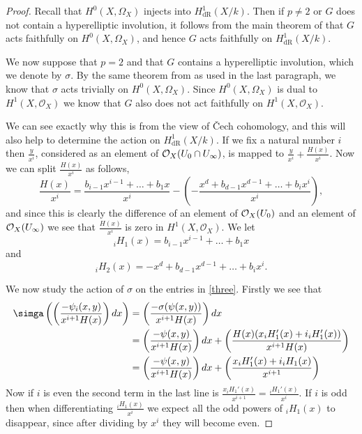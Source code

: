 \documentclass[draft, 11pt]{article} %
\theoremstyle{plain}
\theoremstyle{remark}
\newcommand{\cO}{{\cal O}}
\newcommand{\cech}{\v{C}ech }
\newcommand{\hzero}{{H^0(X,\Omega_X)}}
\newcommand{\hone}{H^1(X,\mathcal{O}_X)}
\newcommand{\derhamhone}{H_{\text {dR}}^1(X/k)}
\begin{document}
\begin{proof}
Recall that $H^0(X,\Omega_X)$ injects into $\derhamhone$.
Then if $p \neq 2$ or $G$ does not contain a hyperelliptic involution, it follows from the main theorem of \cite{faithfulaction} that $G$ acts faithfully on $H^0(X,\Omega_X)$, and hence $G$ acts faithfully on $\derhamhone$.

We now suppose that $p=2$ and that $G$ contains a hyperelliptic involution, which we denote by $\sigma$.
By the same theorem from \cite{faithfulaction} as used in the last paragraph, we know that $\sigma$ acts trivially on $\hzero$.
Since $\hzero$ is dual to $\hone$ we know that $G$ also does not act faithfully on $\hone$.

We can see exactly why this is from the view of \cech cohomology, and this will also help to determine the action on $\derhamhone$.
If we fix a natural number $i$ then $\frac{y}{x^i}$, considered as an element of $\cO_X(U_0\cap U_\infty)$, is mapped to $\frac{y}{x^i} + \frac{H(x)}{x^i}$. 
Now we can split $\frac{H(x)}{x^i}$ as follows, 
\begin{equation*}
\frac{H(x)}{x^i} =  \frac{b_{i-1}x^{i-1} + \ldots + b_1x}{x^i} - \left( - \frac{x^d + b_{d-1}x^{d-1} + \ldots + b_ix^i}{x^i} \right),
\end{equation*}
and since this is clearly the difference of an element of $\cO_X(U_0)$ and an element of $\cO_X(U_\infty)$ we see that $\frac{H(x)}{x^i}$ is zero in $\hone$.
We let 
\[
{}_iH_1(x) = b_{i-1}x^{i-1} + \ldots + b_1x
\]
and 
\[
{}_iH_2(x) = - x^d + b_{d-1}x^{d-1} + \ldots + b_ix^i.
\]

We now study the action of $\sigma$ on the entries in \eqref{three}.
Firstly we see that
\begin{align*}
\simga \left( \left( \frac{-\psi_i(x,y)}{x^{i+1}H(x)} \right) dx\right) & = \left( \frac{-\sigma(\psi(x,y))}{x^{i+1} H(x)} \right) dx \\
& = \left( \frac{-\psi(x,y)}{x^{i+1}H(x)} \right)dx + \left(\frac{H(x)(x{}_iH_1'(x) + i{}_iH_1'(x))}{x^{i+1}H(x)}\right) \\
& = \left( \frac{-\psi(x,y)}{x^{i+1}H(x)} \right)dx + \left(\frac{x{}_iH_1'(x) + i{}_iH_1(x)}{x^{i+1}}\right) \\
\end{align*}
Now if $i$ is even the second term in the last line is $\frac{x{}_iH_1'(x)}{x^{i+1}} = \frac{ {}_iH_1'(x)}{x^i}$.
If $i$ is odd then when differentiating $\frac{ {}_iH_1(x)}{x^{i}}$ we expect all the odd powers of ${}_iH_1(x)$ to disappear, since after dividing by $x^i$ they will become even.



\end{proof}
\end{document}

